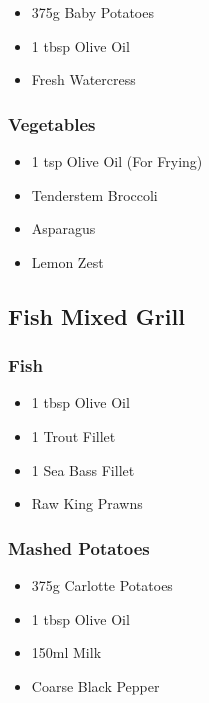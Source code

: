 \documentclass[11pt, english]{article}
\begin{document}
	\begin{itemize}
        \setlength\itemsep{0cm}
		\item 375g Baby Potatoes
		\item 1 tbsp Olive Oil
		\item Fresh Watercress
        \end{itemize}

		\subsubsection*{Vegetables}

	\begin{itemize}
        \setlength\itemsep{0cm}
		\item 1 tsp Olive Oil (For Frying)
		\item Tenderstem Broccoli
		\item Asparagus
		\item Lemon Zest
        \end{itemize}

\newpage

	\subsection{Fish Mixed Grill}

		\subsubsection*{Fish}

	\begin{itemize}
        \setlength\itemsep{0cm}
                \item 1 tbsp Olive Oil
		\item 1 Trout Fillet
		\item 1 Sea Bass Fillet
		\item Raw King Prawns
        \end{itemize}

		\subsubsection*{Mashed Potatoes}

	\begin{itemize}
        \setlength\itemsep{0cm}
                \item 375g Carlotte Potatoes
		\item 1 tbsp Olive Oil
		\item 150ml Milk
		\item Coarse Black Pepper
        \end{itemize}
\end{document}
